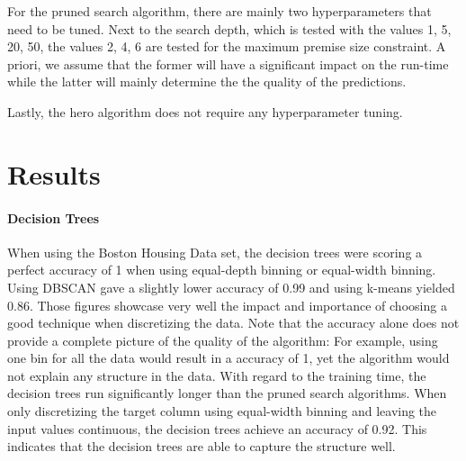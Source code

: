 For the pruned search algorithm, there are mainly two hyperparameters that need to be tuned. Next to the search depth, which is tested with the values {1, 5, 20, 50}, the values {2, 4, 6} are tested for the maximum premise size constraint. A priori, we assume that the former will have a significant impact on the run-time while the latter will mainly determine the the quality of the predictions. 

Lastly, the hero algorithm does not require any hyperparameter tuning. 
 
\section{Results}

\paragraph*{Decision Trees} When using the Boston Housing Data set, the decision trees were scoring a perfect accuracy of 1 when using equal-depth binning or equal-width binning. Using DBSCAN gave a slightly lower accuracy of 0.99 and using k-means yielded 0.86. Those figures showcase very well the impact and importance of choosing a good technique when discretizing the data. Note that the accuracy alone does not provide a complete picture of the quality of the algorithm: For example, using one bin for all the data would result in a accuracy of 1, yet the algorithm would not explain any structure in the data. With regard to the training time, the decision trees run significantly longer than the pruned search algorithms. When only discretizing the target column using equal-width binning and leaving the input values continuous, the decision trees achieve an accuracy of 0.92. This indicates that the decision trees are able to capture the structure well. 

